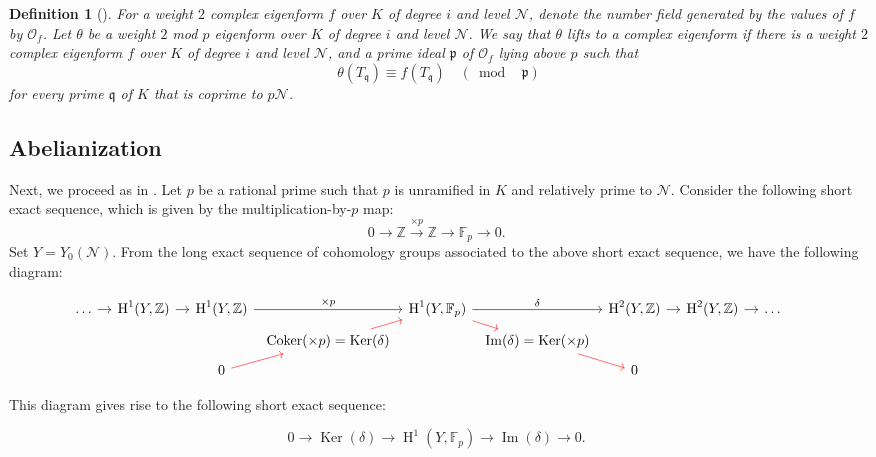 \documentclass[]{article}
\newtheorem{definition}{Definition}
\newcommand {\ZZ}{{\mathbb{Z}}}
\newcommand {\mcalO}{{\mathcal{O}}}
\DeclareMathOperator{\im}{Im}
\DeclareMathOperator{\coker}{Coker}
\DeclareMathOperator{\Ker}{Ker}
\begin{document}
\begin{definition}[{\cite[Section 2.1]{kara2020asymptotic}}]
For a weight $2$ complex eigenform $f$ over $K$ of degree $i$ and level $\mathcal{N}$, denote the number field generated by the values of $f$ by $\mcalO_f$. Let $\theta$ be a weight $2$ mod $p$ eigenform over $K$ of degree $i$ and level $\mathcal{N}$. We say that $\theta$ lifts to a complex eigenform if there is a weight $2$ complex eigenform $f$ over $K$ of degree $i$ and level $\mathcal{N}$, and a prime ideal $\mathfrak{p}$ of $\mcalO_f$ lying above $p$ such that $$\theta(T_{\mathfrak{q}})\equiv f(T_{\mathfrak{q}}) \quad(\bmod\text{ } \mathfrak{p})$$for every prime $\mathfrak{q}$ of $K$ that is coprime to $p\mathcal{N}$. 
\end{definition}

\subsection{Abelianization}
Next, we proceed as in \cite[Section 5]{isik2023ternary}. Let $p$ be a rational prime such that $p$ is unramified in $K$ and relatively prime to $\mathcal{N}$. Consider the following short exact sequence, which is given by the multiplication-by-$p$ map:
$$
0 \longrightarrow \mathbb{Z} \xrightarrow{\times p} \mathbb{Z} \longrightarrow \mathbb{F}_p \longrightarrow 0 \text {. }
$$Set $Y=Y_0(\mathcal{N})$. From the long exact sequence of cohomology groups associated to the above short exact sequence, we have the following diagram:

\begin{footnotesize}
$$
\begin{tikzcd}[row sep=0.5em,column sep=0.5em]
&& \ldots \arrow[rr]& & \operatorname{H}^1(Y,\ZZ) \arrow[rr]  & & \operatorname{H}^1(Y,\ZZ) \arrow[rr, "\times p"]  & & \operatorname{H}^1(Y,\mathbb{F}_p) \arrow[rr, "\delta"] \arrow[red, dr]
 & & \operatorname{H}^2(Y,\ZZ) \arrow[, rr]  & & \operatorname{H}^2(Y,\ZZ) \arrow[rr]  & & \ldots  \\
&& &  & & & & \coker(\times p)=\Ker(\delta) \arrow[red, ur] & &  \im(\delta)=\Ker(\times p) \arrow[red, dr]  & & & &  \\
&&  & & & & 0 \arrow[red, ur] &&   && 0 & & & & & & &&&
\end{tikzcd}
$$
\end{footnotesize}

This diagram gives rise to the following short exact sequence:

$$
0 \longrightarrow \Ker(\delta) \longrightarrow \operatorname{H}^1(Y,\mathbb{F}_p) \longrightarrow \im(\delta) \longrightarrow 0 \text {. }
$$
\end{document}
